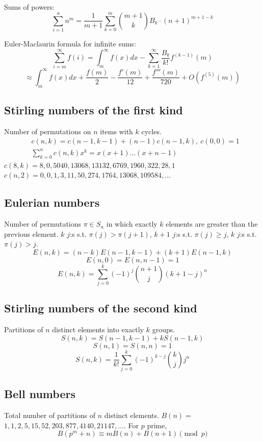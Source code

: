 		Sums of powers:
		\small
		\[ \sum_{i=1}^n n^m = \frac{1}{m+1} \sum_{k=0}^m \binom{m+1}{k} B_k \cdot (n+1)^{m+1-k} \]
		\normalsize

		Euler-Maclaurin formula for infinite sums:
		\small
		\[ \sum_{i=m}^{\infty} f(i) = \int_m^\infty f(x) dx - \sum_{k=1}^\infty \frac{B_k}{k!}f^{(k-1)}(m) \]
		\[ \approx \int_{m}^\infty f(x)dx + \frac{f(m)}{2} - \frac{f'(m)}{12} + \frac{f'''(m)}{720} + O(f^{(5)}(m)) \]
		\normalsize

	\subsection{Stirling numbers of the first kind}
		Number of permutations on $n$ items with $k$ cycles.
		\begin{align*}
			&c(n,k) = c(n-1,k-1) + (n-1) c(n-1,k),\ c(0,0) = 1 \\
			&\textstyle \sum_{k=0}^n c(n,k)x^k = x(x+1) \dots (x+n-1)
		\end{align*}
		$c(8,k) = 8, 0, 5040, 13068, 13132, 6769, 1960, 322, 28, 1$ \\
		$c(n,2) = 0, 0, 1, 3, 11, 50, 274, 1764, 13068, 109584, \dots$

	\subsection{Eulerian numbers}
		Number of permutations $\pi \in S_n$ in which exactly $k$ elements are greater than the previous element. $k$ $j$:s s.t. $\pi(j)>\pi(j+1)$, $k+1$ $j$:s s.t. $\pi(j)\geq j$, $k$ $j$:s s.t. $\pi(j)>j$.
		$$E(n,k) = (n-k)E(n-1,k-1) + (k+1)E(n-1,k)$$
		$$E(n,0) = E(n,n-1) = 1$$
		$$E(n,k) = \sum_{j=0}^k(-1)^j\binom{n+1}{j}(k+1-j)^n$$

	\subsection{Stirling numbers of the second kind}
		Partitions of $n$ distinct elements into exactly $k$ groups.
		$$S(n,k) = S(n-1,k-1) + k S(n-1,k)$$
		$$S(n,1) = S(n,n) = 1$$
		$$S(n,k) = \frac{1}{k!}\sum_{j=0}^k (-1)^{k-j}\binom{k}{j}j^n$$

	\subsection{Bell numbers}
		Total number of partitions of $n$ distinct elements. $B(n) =$
		$1, 1, 2, 5, 15, 52, 203, 877, 4140, 21147, \dots$. For $p$ prime,
		\[ B(p^m+n)\equiv mB(n)+B(n+1) \pmod{p} \]

